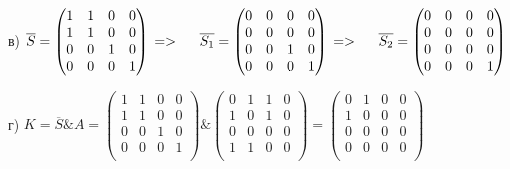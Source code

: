 \documentclass{article}
\begin{document}
в) $\overline{S} = \begin{pmatrix}
	1 & 1 & 0 & 0\\
	1 & 1 & 0 & 0\\
	0 & 0 & 1 & 0\\
	0 & 0 & 0 & 1\\
\end{pmatrix}
\begin{matrix} \\ \\ \\\end{matrix} =>
\hspace{5mm}\overline{S_1} = \begin{pmatrix}
	0 & 0 & 0 & 0\\
	0 & 0 & 0 & 0\\
	0 & 0 & 1 & 0\\
	0 & 0 & 0 & 1\\
\end{pmatrix} 
\begin{matrix} \\ \\ \\\end{matrix} =>
\hspace{5mm}\overline{S_2} = \begin{pmatrix}
	0 & 0 & 0 & 0\\
	0 & 0 & 0 & 0\\
	0 & 0 & 0 & 0\\
	0 & 0 & 0 & 1\\
\end{pmatrix}$ 
\vspace{5mm}
\par
г) $ K = \overline{S} \& A = \begin{pmatrix}
	1 & 1 & 0 & 0\\
	1 & 1 & 0 & 0\\
	0 & 0 & 1 & 0\\
	0 & 0 & 0 & 1\\
\end{pmatrix} \& 
\begin{pmatrix}
	0 & 1 & 1 & 0\\
	1 & 0 & 1 & 0\\
	0 & 0 & 0 & 0\\
	1 & 1 & 0 & 0\\
\end{pmatrix} = 
\begin{pmatrix}
	0 & 1 & 0 & 0\\
	1 & 0 & 0 & 0\\
	0 & 0 & 0 & 0\\
	0 & 0 & 0 & 0\\
\end{pmatrix}$
\end{document}
